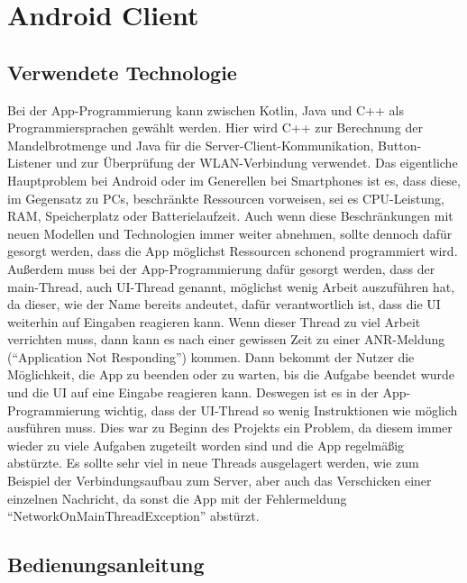 \documentclass[12pt, onecolumn, notitlepage]{scrartcl}
\begin{document}
\section{Android Client}
\subsection{Verwendete Technologie}
Bei der App-Programmierung kann zwischen Kotlin, Java und C++ als Programmiersprachen gewählt werden. Hier wird C++ zur Berechnung der Mandelbrotmenge und Java für die Server-Client-Kommunikation, Button-Listener und zur Überprüfung der WLAN-Verbindung verwendet. Das eigentliche Hauptproblem bei Android oder im Generellen bei Smartphones ist es, dass diese, im Gegensatz zu PCs, beschränkte Ressourcen vorweisen, sei es CPU-Leistung, RAM, Speicherplatz oder Batterielaufzeit. Auch wenn diese Beschränkungen mit neuen Modellen und Technologien immer weiter abnehmen, sollte dennoch dafür gesorgt werden, dass die App möglichst Ressourcen schonend programmiert wird. Außerdem muss bei der App-Programmierung dafür gesorgt werden, dass der main-Thread, auch UI-Thread genannt, möglichst wenig Arbeit auszuführen hat, da dieser, wie der Name bereits andeutet, dafür verantwortlich ist, dass die UI weiterhin auf Eingaben reagieren kann. Wenn dieser Thread zu viel Arbeit verrichten muss, dann kann es nach einer gewissen Zeit zu einer ANR-Meldung (\enquote{Application Not Responding}) kommen. Dann bekommt der Nutzer die Möglichkeit, die App zu beenden oder zu warten, bis die Aufgabe beendet wurde und die UI auf eine Eingabe reagieren kann. Deswegen ist es in der App-Programmierung wichtig, dass der UI-Thread so wenig Instruktionen wie möglich ausführen muss. Dies war zu Beginn des Projekts ein Problem, da diesem immer wieder zu viele Aufgaben zugeteilt worden sind und die App regelmäßig abstürzte. Es sollte sehr viel in neue Threads ausgelagert werden, wie zum Beispiel der Verbindungsaufbau zum Server, aber auch das Verschicken einer einzelnen Nachricht, da sonst die App mit der Fehlermeldung \enquote{NetworkOnMainThreadException} abstürzt.
\subsection{Bedienungsanleitung}
\end{document}
